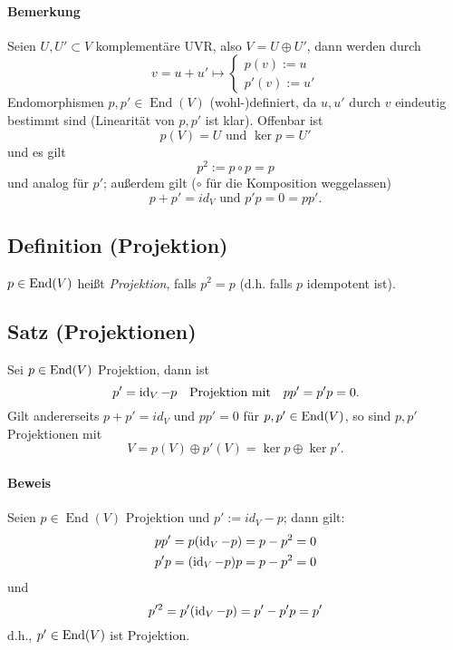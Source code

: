 \paragraph{Bemerkung}
	Seien $ U,U'\subset V $ komplementäre UVR, also $ V = U \oplus U' $, dann werden durch
		\begin{equation*}
		v = u+u' \mapsto
			\begin{cases}
				p(v):=u\\
				p'(v):= u'
			\end{cases}
		\end{equation*}
	Endomorphismen $ p,p'\in \operatorname{End}(V) $ (wohl-)definiert, da $ u,u' $ durch $ v $ eindeutig bestimmt sind (Linearität von $ p,p' $ ist klar).
	Offenbar ist 
		\[ p(V) = U \text{ und } \ker p = U'\]
	und es gilt
		\[ p^2 := p\circ p = p \]
	und analog für $ p' $; außerdem gilt ($ \circ $ für die Komposition weggelassen)
		\[ p+p' = id_V \text{ und } p'p = 0 = pp'.\]
		
\subsection{Definition (Projektion)}
	\begin{Definition}[Projektion]
		$ p\in \operatorname{End}(V) $ heißt \emph{Projektion}, falls $ p^2 = p $ (d.h. falls $ p $ idempotent ist).
	\end{Definition}
	
\subsection{Satz (Projektionen)}
	\begin{Satz}[Projektionen]
	Sei $ p\in \operatorname{End}(V) $ Projektion, dann ist
            \[ p'= \operatorname{id}_V-p \quad\text{Projektion mit}\quad  pp' = p'p = 0.\]
        Gilt andererseits $ p+p' = id_V $ und $ pp' = 0 $ für $ p,p' \in \operatorname{End}(V) $, so sind $ p,p' $ Projektionen mit
		\[ V = p(V)\oplus p'(V) = \ker p \oplus \ker p'. \]
	\end{Satz}

\paragraph{Beweis}
	Seien $p\in \operatorname{End}(V)$ Projektion und $p' := id_V -p$; dann gilt:
		\begin{align*}
		pp' &= p(\operatorname{id}_V-p)=p-p^{2} = 0 \\
		p'p &= (\operatorname{id}_V-p)p = p - p^{2} = 0
		\end{align*}
	und
		\[p'^2 = p'(\operatorname{id}_V-p)=p'-p'p = p'\]
	d.h., $p'\in\operatorname{End}(V)$ ist Projektion.
	

